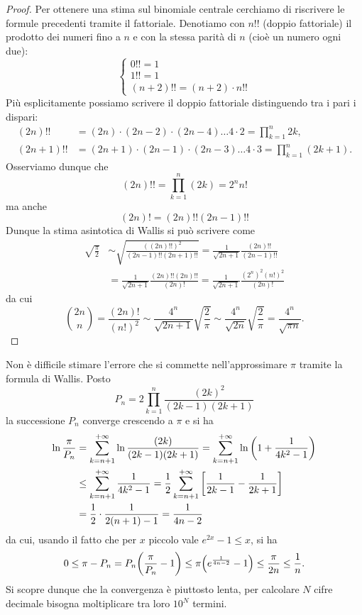 \begin{proof}
Per ottenere una stima sul binomiale centrale cerchiamo di riscrivere le
formule precedenti tramite il fattoriale.
Denotiamo con $n!!$ (doppio fattoriale) il prodotto dei numeri fino a $n$ e
con la stessa parità di $n$ (cioè un numero ogni due):
\[
\begin{cases}
  0!! = 1\\
  1!! = 1\\
  (n+2)!! = (n+2) \cdot n!!
\end{cases}
\]
Più esplicitamente possiamo scrivere il doppio fattoriale
distinguendo tra i pari i dispari:
\begin{align*}
  (2n)!! &= (2n) \cdot (2n-2) \cdot (2n-4) \dots 4 \cdot 2 = \prod_{k=1}^n 2k, \\
  (2n+1)!! &= (2n+1)\cdot(2n-1)\cdot(2n-3)\dots 4\cdot 3
   = \prod_{k=1}^n (2k+1).
\end{align*}
Osserviamo dunque che
\[
  (2n)!! = \prod_{k=1}^n (2k) = 2^n n!
\]
ma anche
\[
  (2n)! = (2n)!! (2n-1)!!
\]
Dunque la stima asintotica di Wallis si può scrivere come
\begin{align*}
 \sqrt{\frac{\pi}{2}} &\sim \sqrt{\frac{((2n)!!)^2}{(2n-1)!!(2n+1)!!}}
 = \frac{1}{\sqrt{2n+1}} \frac{(2n)!!}{(2n-1)!!} \\
 &= \frac{1}{\sqrt{2n+1}}\frac{(2n)!!(2n)!!}{(2n)!}
 = \frac{1}{\sqrt{2n+1}}\frac{(2^n)^2 (n!)^2}{(2n)!}
\end{align*}
da cui
\[
{2n \choose n} = \frac{(2n)!}{(n!)^2}
\sim \frac{4^n}{\sqrt{2n+1}}\sqrt{\frac 2 \pi}
\sim \frac{4^n}{\sqrt{2n}}\sqrt{\frac 2 \pi}
 = \frac{4^n}{\sqrt{\pi n}}.
\]
\end{proof}

\begin{remark}\label{rem:cifre_pi}
Non è difficile stimare l'errore che si commette nell'approssimare
$\pi$ tramite la formula di Wallis. Posto
\[
  P_n = 2 \prod_{k=1}^n \frac{(2k)^2}{(2k-1)(2k+1)}
\]
la successione $P_n$ converge crescendo a $\pi$ e si ha
\begin{align*}
\ln\frac{\pi}{P_n}
&= \sum_{k=n+1}^{+\infty}\ln \frac{(2k)}{(2k-1)(2k+1)}
= \sum_{k=n+1}^{+\infty}\ln {\left( 1+\frac{1}{4k^2-1} \right)} \\
&\le \sum_{k=n+1}^{+\infty}\frac{1}{4k^2-1}
= \frac 1 2 \sum_{k=n+1}^{+\infty}{\left[ \frac{1}{2k-1} - \frac{1}{2k+1} \right]}\\
&= \frac 1 2 \cdot \frac{1}{2(n+1)-1}
= \frac{1}{4n-2}
\end{align*}
da cui, usando il fatto che per
$x$ piccolo vale $e^{2x}-1 \le x$,
si ha
\[
 0
 \le \pi-P_n
 = P_n{\left( \frac{\pi}{P_n} - 1 \right)}
 \le \pi {\left( e^{\frac{1}{4n-2}}-1 \right)}
 \le \frac{\pi}{2n} \le \frac{1}{n}.
\]
Si scopre dunque che la convergenza è piuttosto lenta,
per calcolare $N$ cifre decimale bisogna moltiplicare
tra loro $10^N$ termini.
\end{remark}

